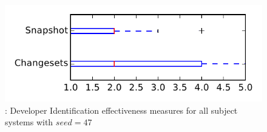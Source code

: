 
\begin{figure}
\centering
\includegraphics[height=0.4\textheight]{figures/dit_seed/rq1_tiny_47}
\caption{\rtwo: Developer Identification effectiveness measures for all subject systems with $seed=47$}
\label{fig:dit_seed:rq1:tiny}
\end{figure}
